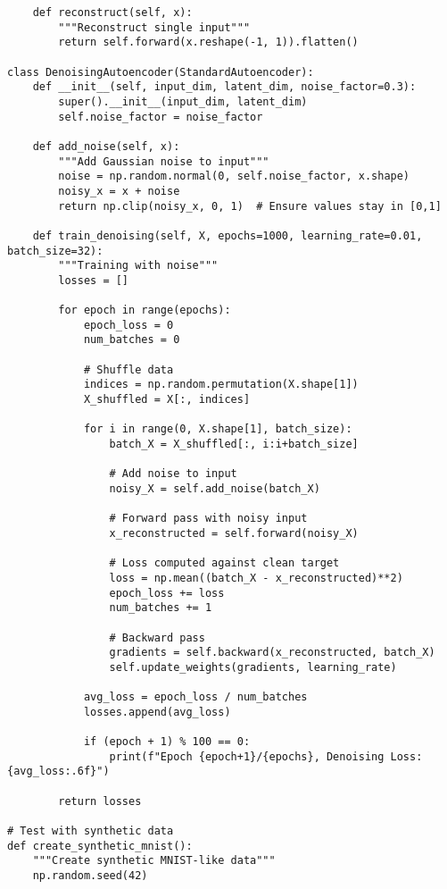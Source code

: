 ﻿\documentclass[12pt,a4paper]{article}
\begin{document}
\begin{lstlisting}
    def reconstruct(self, x):
        """Reconstruct single input"""
        return self.forward(x.reshape(-1, 1)).flatten()

class DenoisingAutoencoder(StandardAutoencoder):
    def __init__(self, input_dim, latent_dim, noise_factor=0.3):
        super().__init__(input_dim, latent_dim)
        self.noise_factor = noise_factor
    
    def add_noise(self, x):
        """Add Gaussian noise to input"""
        noise = np.random.normal(0, self.noise_factor, x.shape)
        noisy_x = x + noise
        return np.clip(noisy_x, 0, 1)  # Ensure values stay in [0,1]
    
    def train_denoising(self, X, epochs=1000, learning_rate=0.01, batch_size=32):
        """Training with noise"""
        losses = []
        
        for epoch in range(epochs):
            epoch_loss = 0
            num_batches = 0
            
            # Shuffle data
            indices = np.random.permutation(X.shape[1])
            X_shuffled = X[:, indices]
            
            for i in range(0, X.shape[1], batch_size):
                batch_X = X_shuffled[:, i:i+batch_size]
                
                # Add noise to input
                noisy_X = self.add_noise(batch_X)
                
                # Forward pass with noisy input
                x_reconstructed = self.forward(noisy_X)
                
                # Loss computed against clean target
                loss = np.mean((batch_X - x_reconstructed)**2)
                epoch_loss += loss
                num_batches += 1
                
                # Backward pass
                gradients = self.backward(x_reconstructed, batch_X)
                self.update_weights(gradients, learning_rate)
            
            avg_loss = epoch_loss / num_batches
            losses.append(avg_loss)
            
            if (epoch + 1) % 100 == 0:
                print(f"Epoch {epoch+1}/{epochs}, Denoising Loss: {avg_loss:.6f}")
        
        return losses

# Test with synthetic data
def create_synthetic_mnist():
    """Create synthetic MNIST-like data"""
    np.random.seed(42)
    

\end{lstlisting}
\end{document}
